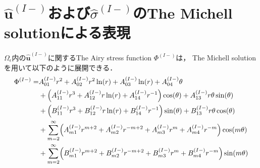 \section{$\hat{\bm{u}}^{(I-)}$および$\hat{\sigma}^{(I-)}$のThe Michell solutionによる表現}

$\Omega_\epsilon$内の$\hat{\bm{u}}^{(I-)}$に関するThe Airy stress function $\Phi^{(I-)}$は，
The Michell solutionを用いて以下のように展開できる．
\begin{align}
	\Phi^{(I-)} =&A_{01}^{(I-)}r^2+A_{02}^{(I-)}r^2\ln(r)+A_{03}^{(I-)}\ln(r)+A_{04}^{(I-)}\theta
	\nonumber
	\\
	&+\Bigl(A_{11}^{(I-)}r^3+A_{12}^{(I-)}r\ln(r)+A_{14}^{(I-)}r^{-1}\Bigr)\cos(\theta)+A_{13}^{(I-)}r\theta \sin(\theta)
	\nonumber
	\\
	&+\Bigl(B_{11}^{(I-)}r^3+B_{12}^{(I-)}r\ln(r)+B_{14}^{(I-)}r^{-1}\Bigr)\sin(\theta)+B_{13}^{(I-)}r\theta \cos(\theta)
	\nonumber
	\\
	&+\sum_{m=2}^{\infty}\Bigl(A_{m1}^{(I-)}r^{m+2}+A_{m2}^{(I-)}r^{-m+2}
	+A_{m3}^{(I-)}r^{m}+A_{m4}^{(I-)}r^{-m}\Bigr)\cos(m\theta)
	\nonumber
	\\
	&+\sum_{m=2}^{\infty}\Bigl(B_{m1}^{(I-)}r^{m+2}+B_{m2}^{(I-)}r^{-m+2}
	+B_{m3}^{(I-)}r^{m}+B_{m4}^{(I-)}r^{-m}\Bigr)\sin(m\theta)
	\label{eq:AiryIn1}
\end{align}

